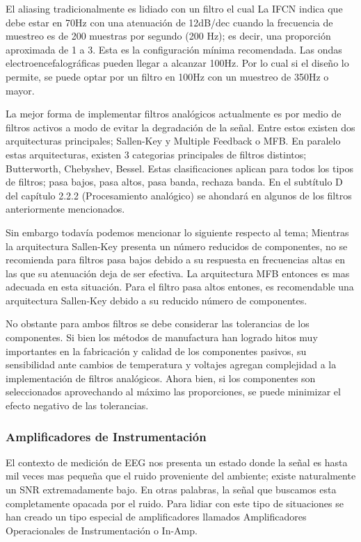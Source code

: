 El aliasing tradicionalmente es lidiado con un filtro el cual La IFCN indica que debe estar en 70Hz con una atenuación de 12dB/dec cuando la frecuencia de muestreo es de 200 muestras por segundo (200 Hz); es decir, una proporción aproximada de 1 a 3. Esta es la configuración mínima recomendada. Las ondas electroencefalográficas pueden llegar a alcanzar 100Hz. Por lo cual si el diseño lo permite, se puede optar por un filtro en 100Hz con un muestreo de 350Hz o mayor.

La mejor forma de implementar filtros analógicos actualmente es por medio de filtros activos a modo de evitar la degradación de la señal. Entre estos existen dos arquitecturas principales; Sallen-Key y Multiple Feedback o MFB. En paralelo estas arquitecturas, existen 3 categorias principales de filtros distintos; Butterworth, Chebyshev, Bessel. Estas clasificaciones aplican para todos los tipos de filtros; pasa bajos, pasa altos, pasa banda, rechaza banda. En el subtítulo D del capítulo 2.2.2 (Procesamiento analógico) se ahondará en algunos de los filtros anteriormente mencionados.

Sin embargo todavía podemos mencionar lo siguiente respecto al tema; Mientras la arquitectura Sallen-Key presenta un número reducidos de componentes, no se recomienda para filtros pasa bajos debido a su respuesta en frecuencias altas en las que su atenuación deja de ser efectiva. La arquitectura MFB entonces es mas adecuada en esta situación. Para el filtro pasa altos entones, es recomendable una arquitectura Sallen-Key debido a su reducido número de componentes.

No obstante para ambos filtros se debe considerar las tolerancias de los componentes. Si bien los métodos de manufactura han logrado hitos muy importantes en la fabricación y calidad de los componentes pasivos, su sensibilidad ante cambios de temperatura y voltajes agregan complejidad a la implementación de filtros analógicos. Ahora bien, si los componentes son seleccionados aprovechando al máximo las proporciones, se puede minimizar el efecto negativo de las tolerancias.

\subsubsection{Amplificadores de Instrumentación}
\label{sec:org98b2a63}
El contexto de medición de EEG nos presenta un estado donde la señal es hasta mil veces mas pequeña que el ruido proveniente del ambiente; existe naturalmente un SNR extremadamente bajo. En otras palabras, la señal que buscamos esta completamente opacada por el ruido. Para lidiar con este tipo de situaciones se han creado un tipo especial de amplificadores llamados Amplificadores Operacionales de Instrumentación o In-Amp.

